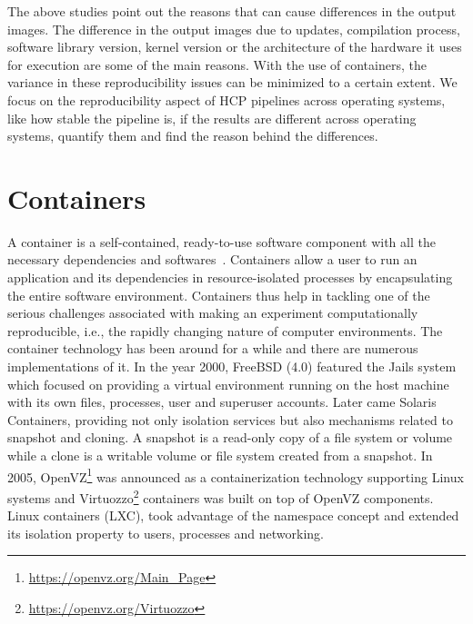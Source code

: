 The above studies point out the reasons that can cause differences in the output images. The difference in the output images due to updates, compilation process, software library version, kernel version or the architecture of the hardware it uses for execution are some of the main reasons. With the use of containers, the variance in these reproducibility issues can be minimized to a certain extent. We focus on the reproducibility aspect of HCP pipelines across operating systems, like how stable the pipeline is, if the results are different across operating systems, quantify them and find the reason behind the differences.

\section{Containers}\label{containers}
A container is a self-contained, ready-to-use software component with all the necessary dependencies and softwares~\cite{7158965}. Containers allow a user to run an application and its dependencies in resource-isolated processes by encapsulating the entire software environment. Containers thus help in tackling one of the serious challenges associated with making an experiment computationally reproducible, i.e., the rapidly changing nature of computer environments.
The container technology has been around for a while and there are numerous implementations of it. In the year 2000, FreeBSD (4.0) featured the Jails system which focused on providing a virtual environment running on the host machine with its own files, processes, user and superuser accounts. Later came Solaris Containers, providing not only isolation services but also mechanisms related to snapshot and cloning. A snapshot is a read-only copy of a file system or volume while a clone is a writable volume or file system created from a snapshot. In 2005, OpenVZ\footnote{\url{https://openvz.org/Main_Page}} was announced as a containerization technology supporting Linux systems and Virtuozzo\footnote{\url{https://openvz.org/Virtuozzo}} containers was built on top of OpenVZ components. Linux containers (LXC), took advantage of the namespace concept and extended its isolation property to users, processes and networking.
